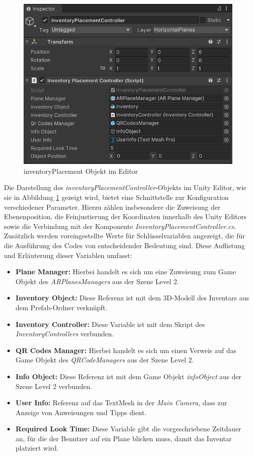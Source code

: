 \begin{figure}[H]
\centering
\includegraphics[scale=0.8]{images/invPlace_Editor}
\caption{inventoryPlacement Objekt im Editor}
\label{fig:inventoryPlacementController_Editor}
\end{figure}

Die Darstellung des \textit{inventoryPlacementController}-Objekts im Unity Editor, wie sie in Abbildung \ref{fig:inventoryPlacementController_Editor}
gezeigt wird, bietet eine Schnittstelle zur Konfiguration verschiedener Parameter. Hierzu zählen insbesondere die Zuweisung
der Ebenenposition, die Feinjustierung der Koordinaten innerhalb des Unity Editors sowie die Verbindung mit der Komponente
\textit{InventoryPlacementController.cs}. Zusätzlich werden voreingestellte Werte für Schlüsselvariablen angezeigt, die
für die Ausführung des Codes von entscheidender Bedeutung sind. Diese Auflistung und Erläuterung dieser Variablen umfasst:

\begin{itemize}
    \item \textbf{Plane Manager:} Hierbei handelt es sich um eine Zuweisung zum Game Objekt des \textit{ARPlanesManagers}
    aus der Szene Level 2.
    \item \textbf{Inventory Object:} Diese Referenz ist mit dem 3D-Modell des Inventars aus dem Prefab-Ordner verknüpft.
    \item \textbf{Inventory Controller:} Diese Variable ist mit dem Skript des \textit{InventoryControllers} verbunden.
    \item \textbf{QR Codes Manager:} Hierbei handelt es sich um einen Verweis auf das Game Objekt des \textit{QRCodeManagers}
    aus der Szene Level 2.
    \item \textbf{Info Object:} Diese Referenz ist mit dem Game Objekt \textit{infoObject} aus der Szene Level 2 verbunden.
    \item \textbf{User Info:} Referenz auf das TextMesh in der \textit{Main Camera}, dass zur Anzeige von Anweisungen und
    Tipps dient.
    \item \textbf{Required Look Time:} Diese Variable gibt die vorgeschriebene Zeitdauer an, für die der Benutzer auf ein
    Plane blicken muss, damit das Inventar platziert wird.
\end{itemize}

